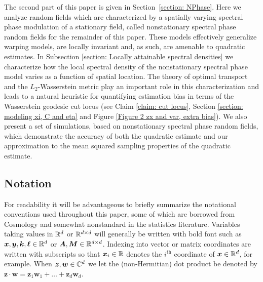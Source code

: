 \documentclass[10pt,noinfoline]{imsart}
\newcommand{\bs}{\boldsymbol}
\begin{document}
The second part of this paper is given in Section~\ref{section: NPhase}. Here we analyze random fields which are characterized by a spatially varying spectral phase modulation of a stationary field, called nonstationary spectral phase random fields for the remainder of this paper. These models effectively generalize warping models, are locally invariant and, as such, are amenable to quadratic estimates. In Subsection \ref{section: Locally attainable spectral densities} we characterize how the local spectral density of the nonstationary spectral phase model varies as a function of spatial location. The theory of optimal transport and the $L_2$-Wasserstein metric play an important role in this characterization and leads to a natural heuristic for quantifying estimation bias in terms of the Wasserstein geodesic cut locus (see Claim \ref{claim: cut locus}, Section \ref{section: modeling xi, C and eta} and Figure \ref{Figure 2 zx and var, extra bias}). We also present a set of simulations, based on nonstationary spectral phase random fields, which demonstrate the accuracy of both the quadratic estimate and our approximation to the mean squared sampling properties of the quadratic estimate. 





\subsection{Notation}

For readability it will be advantageous to briefly summarize the notational conventions used throughout this paper, some of which are borrowed from Cosmology and somewhat nonstandard in the statistics literature.
Variables taking values in $\Bbb R^d$ or $\Bbb R^{d\times d}$ will generally be written with bold font such as $\bs x, \bs y, \bs k,\bs \ell\in \Bbb R^d$ or $\bs A,\bs M \in \Bbb R^{d\times d}$. Indexing into vector or matrix coordinates are written with subscripts so that $\bs x_i\in\Bbb R$ denotes the $i^{\text{th}}$ coordinate of $\bs x\in\Bbb R^d$, for example. When $\bs z, \bs w\in\Bbb C^d$ we let the (non-Hermitian) dot product  be denoted by $\bs z \cdot \bs w = \bs z_1 \bs w_1 + \ldots + \bs z_d \bs w_d$.
\end{document}
